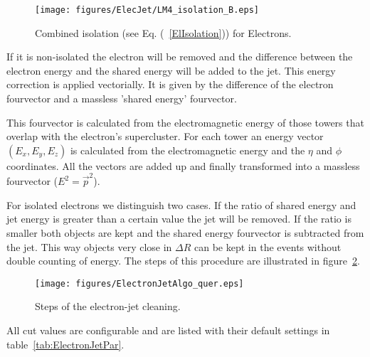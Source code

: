 \documentclass{cmspaper}
\begin{document}
\begin{figure}[hbtp]
  \begin{center}
    \texttt{[image: figures/ElecJet/LM4\_isolation\_B.eps]}
    \caption{Combined isolation (see Eq. (~\ref{ElIsolation})) for Electrons.}
    \label{fig:ElectronIsolation}
  \end{center}
\end{figure}

If it is non-isolated the electron will be removed and the difference between
the electron energy and the shared energy will be added to the jet. This energy
correction is applied vectorially. It is given by the difference of the electron
fourvector and a massless 'shared energy' fourvector.

This fourvector is calculated from the electromagnetic energy of those towers
that overlap with the electron's supercluster. For each
tower an energy vector $(E_x, E_y, E_z)$ is calculated from the electromagnetic
energy and the $\eta$ and $\phi$ coordinates. All the vectors are added
up and finally transformed into a massless fourvector ($E^2=\vec{p}^2$).

For isolated electrons we distinguish two cases. If the ratio of shared energy
and jet energy is greater than a certain value the jet will be removed. If the
ratio is smaller both objects are kept and the shared energy fourvector is
subtracted from the jet. This way objects very close in $\Delta R$ can be kept
in the events without double counting of energy.  The steps of this procedure
are illustrated in figure~\ref{fig:EJCleaning}.

\begin{figure}[hbtp]
  \begin{center}
    \texttt{[image: figures/ElectronJetAlgo\_quer.eps]}
    \caption{Steps of the electron-jet cleaning.}
    \label{fig:EJCleaning}
  \end{center}
\end{figure}

All cut values are configurable and are listed with their default settings in
table~\ref{tab:ElectronJetPar}.
\end{document}
